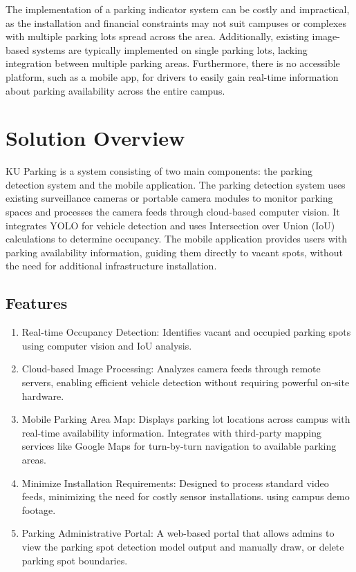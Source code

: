 The implementation of a parking indicator system can be costly and impractical, as the installation and financial constraints may not suit campuses or complexes with multiple parking lots spread across the area. Additionally, existing image-based systems are typically implemented on single parking lots, lacking integration between multiple parking areas. Furthermore, there is no accessible platform, such as a mobile app, for drivers to easily gain real-time information about parking availability across the entire campus.

\section{Solution Overview}
\label{section:solution-overview}

KU Parking is a system consisting of two main components: the parking detection system and the mobile application. The parking detection system uses existing surveillance cameras or portable camera modules to monitor parking spaces and processes the camera feeds through cloud-based computer vision. It integrates YOLO for vehicle detection and uses Intersection over Union (IoU) calculations to determine occupancy. The mobile application provides users with parking availability information, guiding them directly to vacant spots, without the need for additional infrastructure installation.

\subsection{Features}
\label{subsection:features}

\begin{enumerate}[leftmargin=80pt]
    \item Real-time Occupancy Detection: Identifies vacant and occupied parking spots using computer vision and IoU analysis.
    
    \item Cloud-based Image Processing: Analyzes camera feeds through remote servers, enabling efficient vehicle detection without requiring powerful on-site hardware.
    
    \item Mobile Parking Area Map: Displays parking lot locations across campus with real-time availability information. Integrates with third-party mapping services like Google Maps for turn-by-turn navigation to available parking areas.
    
    \item Minimize Installation Requirements: Designed to process standard video feeds, minimizing the need for costly sensor installations.
    using campus demo footage.

    \item Parking Administrative Portal: A web-based portal that allows
    admins to view the parking spot detection model output and manually draw, or delete parking
    spot boundaries.
\end{enumerate}

